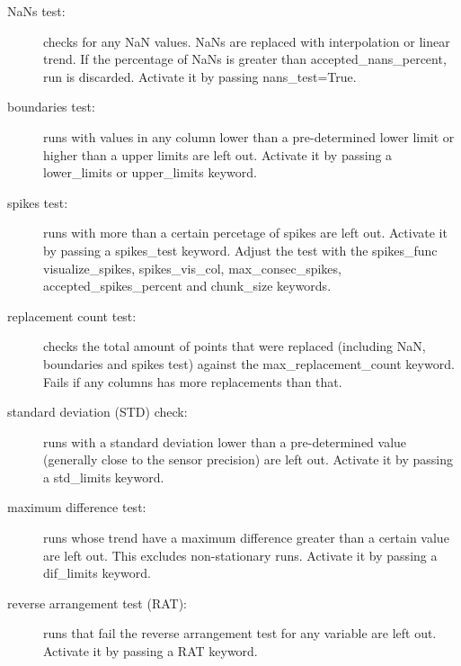 \documentclass[a4paper,10pt,english]{sphinxmanual}
\begin{document}
\begin{fulllineitems}
\begin{description}
\end{description}
\begin{description}
\item[{NaNs test:}] \leavevmode
checks for any NaN values. NaNs are replaced with interpolation or linear trend. If the percentage
of NaNs is greater than accepted\_nans\_percent, run is discarded. Activate it by passing nans\_test=True.

\item[{boundaries test:}] \leavevmode
runs with values in any column lower than a pre-determined lower limit or higher
than a upper limits are left out. Activate it by passing a lower\_limits or upper\_limits keyword.

\item[{spikes test:}] \leavevmode
runs with more than a certain percetage of spikes are left out. 
Activate it by passing a spikes\_test keyword. Adjust the test with the spikes\_func
visualize\_spikes, spikes\_vis\_col, max\_consec\_spikes, accepted\_spikes\_percent and chunk\_size keywords.

\item[{replacement count test:}] \leavevmode
checks the total amount of points that were replaced (including NaN, boundaries and spikes test)
against the max\_replacement\_count keyword. Fails if any columns has more replacements than that.

\item[{standard deviation (STD) check:}] \leavevmode
runs with a standard deviation lower than a pre-determined value (generally close to the
sensor precision) are left out.
Activate it by passing a std\_limits keyword.

\item[{maximum difference test:}] \leavevmode
runs whose trend have a maximum difference greater than a certain value are left out.
This excludes non-stationary runs. Activate it by passing a dif\_limits keyword.

\item[{reverse arrangement test (RAT):}] \leavevmode
runs that fail the reverse arrangement test for any variable are left out.
Activate it by passing a RAT keyword.

\end{description}

\end{fulllineitems}

\end{document}
